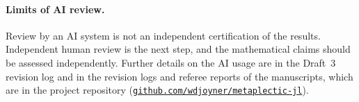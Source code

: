\documentclass[12pt,letterpaper,oneside]{book}
\theoremstyle{plain}
\theoremstyle{definition}
\begin{document}


\paragraph{Limits of AI review.} Review by an AI system is not an
independent certification of the results. Independent human review
is the next step, and the mathematical claims should
be assessed independently. Further details on the AI usage are in the
Draft~3 revision log and in the revision logs and referee reports
of the manuscripts, which are in the project repository
(\href{https://github.com/wdjoyner/metaplectic-jl}{\nolinkurl{github.com/wdjoyner/metaplectic-jl}}).



\cleardoublepage
{}
\begingroup

\printindex
\endgroup
\end{document}
